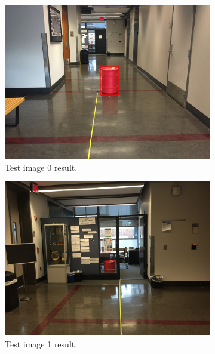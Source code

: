 \documentclass[a4paper]{article}
\begin{document}
\begin{figure}[!tbp]
  \centering
  \begin{subfigure}[b]{.4\textwidth}
    \includegraphics[width=1\textwidth]{test_image0.png}
\caption{\label{fig:test0}Test image 0 result.}
  \end{subfigure}
  \begin{subfigure}[b]{.4\textwidth}
    \includegraphics[width=1\textwidth]{test_image1.png}
\caption{\label{fig:test1}Test image 1 result.}
  \end{subfigure}
  \caption{\label{fig:test1_set}}
\end{figure}
\end{document}
